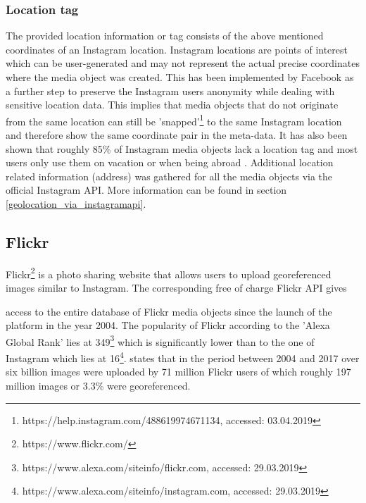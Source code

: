 \subsubsection{Location tag} \label{instagram_location_tag}
The provided location information or tag consists of the above mentioned coordinates of an Instagram location. Instagram locations are points of interest which can be user-generated and may not represent the actual precise coordinates where the media object was created. This has been implemented by Facebook as a further step to preserve the Instagram users anonymity while dealing with sensitive location data. This implies that media objects that do not originate from the same location can still be 'snapped'\footnote{https://help.instagram.com/488619974671134, accessed: 03.04.2019} to the same Instagram location and therefore show the same coordinate pair in the meta-data.
It has also been shown that roughly 85\% of Instagram media objects lack a location tag and most users only use them on vacation or when being abroad \parencite{Flatow2015}.
Additional location related information (address) was gathered for all the media objects via the official Instagram API. More information can be found in section \ref{geolocation_via_instagramapi}.



\subsection{Flickr} \label{flickr}
Flickr\footnote{https://www.flickr.com/} is a photo sharing website that allows users to upload georeferenced images similar to Instagram. The corresponding free of charge Flickr API gives

\renewcommand{\thefootnote}{\alph{footnote}}

access to the entire database of Flickr media objects since the launch of the platform in the year 2004. The popularity of Flickr according to the 'Alexa Global Rank' lies at 349\footnote{https://www.alexa.com/siteinfo/flickr.com, accessed: 29.03.2019} which is significantly lower than to the one of Instagram which lies at 16\footnote{https://www.alexa.com/siteinfo/instagram.com, accessed: 29.03.2019}. \textcite{Tenkanen2017} states that in the period between 2004 and 2017 over six billion images were uploaded by 71 million Flickr users of which roughly 197 million images or 3.3\% were georeferenced. 

\renewcommand{\thefootnote}{\arabic{footnote}}


